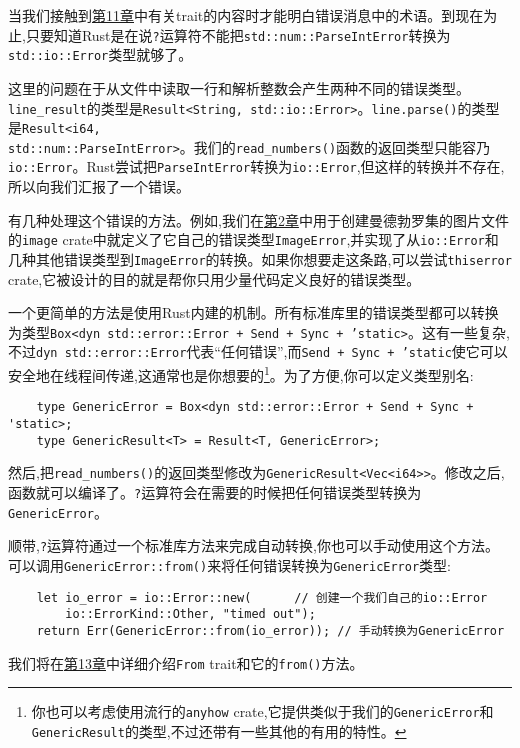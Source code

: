 当我们接触到\hyperref[ch11]{第11章}中有关trait的内容时才能明白错误消息中的术语。到现在为止,只要知道Rust是在说\texttt{?}运算符不能把\texttt{std::num::ParseIntError}转换为\texttt{std::io::Error}类型就够了。

这里的问题在于从文件中读取一行和解析整数会产生两种不同的错误类型。\texttt{line\_result}的类型是\texttt{Result<String, std::io::Error>}。\texttt{line.parse()}的类型是\texttt{Result<i64,\\
std::num::ParseIntError>}。我们的\texttt{read\_numbers()}函数的返回类型只能容乃\texttt{io::Error}。Rust尝试把\texttt{ParseIntError}转换为\texttt{io::Error},但这样的转换并不存在,所以向我们汇报了一个错误。

有几种处理这个错误的方法。例如,我们在\hyperref[ch02]{第2章}中用于创建曼德勃罗集的图片文件的\texttt{image} crate中就定义了它自己的错误类型\texttt{ImageError},并实现了从\texttt{io::Error}和几种其他错误类型到\texttt{ImageError}的转换。如果你想要走这条路,可以尝试\texttt{thiserror} crate,它被设计的目的就是帮你只用少量代码定义良好的错误类型。

一个更简单的方法是使用Rust内建的机制。所有标准库里的错误类型都可以转换为类型\texttt{Box<dyn std::error::Error + Send + Sync + 'static>}。这有一些复杂,不过\texttt{dyn std::error::Error}代表“任何错误”,而\texttt{Send + Sync + 'static}使它可以安全地在线程间传递,这通常也是你想要的\footnote{你也可以考虑使用流行的\texttt{anyhow} crate,它提供类似于我们的\texttt{GenericError}和\texttt{GenericResult}的类型,不过还带有一些其他的有用的特性。}。为了方便,你可以定义类型别名:
\begin{verbatim}
    type GenericError = Box<dyn std::error::Error + Send + Sync + 'static>;
    type GenericResult<T> = Result<T, GenericError>;
\end{verbatim}

然后,把\texttt{read\_numbers()}的返回类型修改为\texttt{GenericResult<Vec<i64>>}。修改之后,函数就可以编译了。\texttt{?}运算符会在需要的时候把任何错误类型转换为\texttt{GenericError}。

顺带,\texttt{?}运算符通过一个标准库方法来完成自动转换,你也可以手动使用这个方法。可以调用\texttt{GenericError::from()}来将任何错误转换为\texttt{GenericError}类型:
\begin{verbatim}
    let io_error = io::Error::new(      // 创建一个我们自己的io::Error
        io::ErrorKind::Other, "timed out");
    return Err(GenericError::from(io_error)); // 手动转换为GenericError
\end{verbatim}

我们将在\hyperref[ch13]{第13章}中详细介绍\texttt{From} trait和它的\texttt{from()}方法。

